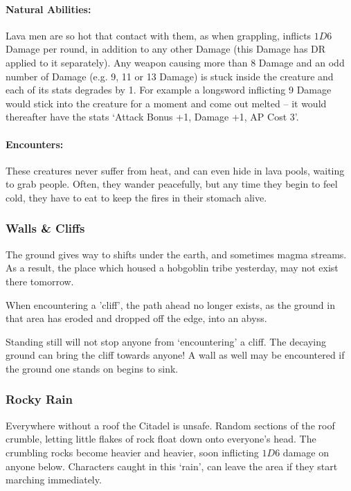 \begin{multicols}{2}
\paragraph{Natural Abilities:} Lava men are so hot that contact with them, as when grappling, inflicts $1D6$ Damage per round, in addition to any other Damage (this Damage has DR applied to it separately).
Any weapon causing more than 8 Damage and an odd number of Damage (e.g. 9, 11 or 13 Damage) is stuck inside the creature and each of its stats degrades by 1.
For example a longsword inflicting 9 Damage would stick into the creature for a moment and come out melted -- it would thereafter have the stats `Attack Bonus +1, Damage +1, AP Cost 3'.

\paragraph{Encounters:} These creatures never suffer from heat, and can even hide in lava pools, waiting to grab people.
Often, they wander peacefully, but any time they begin to feel cold, they have to eat to keep the fires in their stomach alive.

\lavaman

\subsubsection{Walls \& Cliffs}

The ground gives way to shifts under the earth, and sometimes magma streams.
As a result, the place which housed a hobgoblin tribe yesterday, may not exist there tomorrow.

When encountering a 'cliff', the path ahead no longer exists, as the ground in that area has eroded and dropped off the edge, into an abyss.

Standing still will not stop anyone from `encountering' a cliff.
The decaying ground can bring the cliff towards anyone!
A wall as well may be encountered if the ground one stands on begins to sink.

\subsubsection{Rocky Rain}

Everywhere without a roof the Citadel is unsafe.
Random sections of the roof crumble, letting little flakes of rock float down onto everyone's head.
The crumbling rocks become heavier and heavier, soon inflicting $1D6$ damage on anyone below.
Characters caught in this `rain', can leave the area if they start marching immediately.


\end{multicols}
